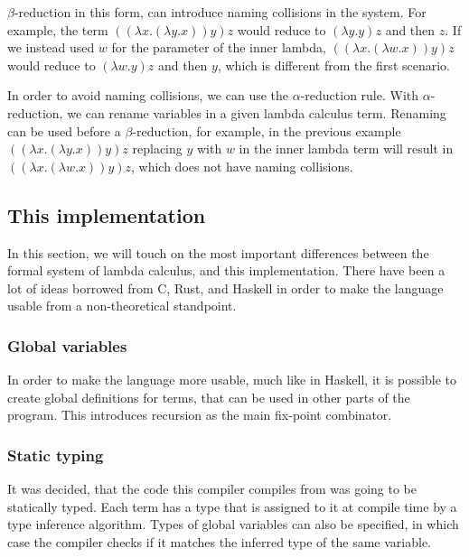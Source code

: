 \documentclass[12pt]{article}
\begin{document}
$\beta$-reduction in this form, can introduce naming collisions in the system.
For example, the term $((\lambda x. (\lambda y. x)) y) z$ would reduce to
$(\lambda y. y) z$ and then $z$. If we instead used $w$ for the parameter of the
inner lambda, $((\lambda x. (\lambda w. x)) y) z$ would reduce to $(\lambda w.
y) z$ and then $y$, which is different from the first scenario.

In order to avoid naming collisions, we can use the $\alpha$-reduction rule.
With $\alpha$-reduction, we can rename variables in a given lambda calculus
term. Renaming can be used before a $\beta$-reduction, for example, in the
previous example $((\lambda x. (\lambda y. x)) y) z$ replacing $y$ with $w$ in
the inner lambda term will result in $((\lambda x. (\lambda w. x)) y) z$, which
does not have naming collisions.


\subsection{This implementation} %

In this section, we will touch on the most important differences between the
formal system of lambda calculus, and this implementation. There have been a lot
of ideas borrowed from C, Rust, and Haskell in order to make the language usable
from a non-theoretical standpoint.

\subsubsection{Global variables} %

In order to make the language more usable, much like in Haskell, it is possible
to create global definitions for terms, that can be used in other parts of the
program. This introduces recursion as the main fix-point combinator.

\subsubsection{Static typing} %

It was decided, that the code this compiler compiles from was going to be
statically typed. Each term has a type that is assigned to it at compile time by
a type inference algorithm. Types of global variables can also be specified, in
which case the compiler checks if it matches the inferred type of the same
variable.
\end{document}
